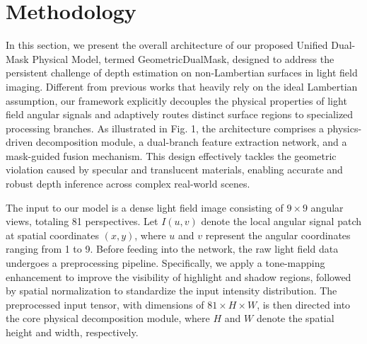 \documentclass[lettersize,journal]{IEEEtran}
\begin{document}
\section{Methodology}

In this section, we present the overall architecture of our proposed Unified Dual-Mask Physical Model, termed GeometricDualMask, designed to address the persistent challenge of depth estimation on non-Lambertian surfaces in light field imaging. Different from previous works that heavily rely on the ideal Lambertian assumption, our framework explicitly decouples the physical properties of light field angular signals and adaptively routes distinct surface regions to specialized processing branches. As illustrated in Fig. 1, the architecture comprises a physics-driven decomposition module, a dual-branch feature extraction network, and a mask-guided fusion mechanism. This design effectively tackles the geometric violation caused by specular and translucent materials, enabling accurate and robust depth inference across complex real-world scenes.

The input to our model is a dense light field image consisting of $9 \times 9$ angular views, totaling 81 perspectives. Let $I(u,v)$ denote the local angular signal patch at spatial coordinates $(x,y)$, where $u$ and $v$ represent the angular coordinates ranging from 1 to 9. Before feeding into the network, the raw light field data undergoes a preprocessing pipeline. Specifically, we apply a tone-mapping enhancement to improve the visibility of highlight and shadow regions, followed by spatial normalization to standardize the input intensity distribution. The preprocessed input tensor, with dimensions of $81 \times H \times W$, is then directed into the core physical decomposition module, where $H$ and $W$ denote the spatial height and width, respectively.
\end{document}
